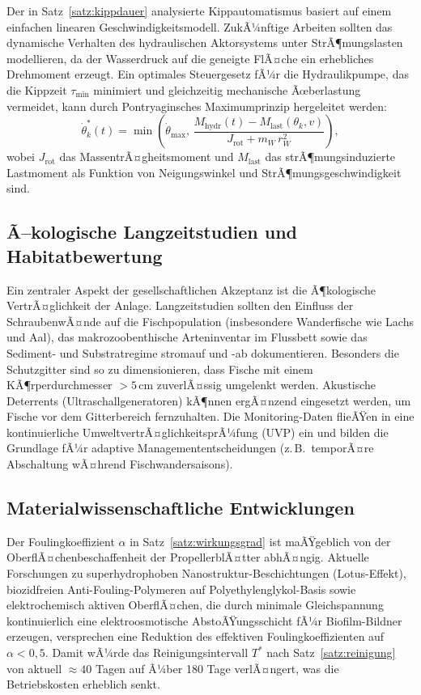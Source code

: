 ﻿\documentclass[a4paper,12pt]{article}
\theoremstyle{definition}
\begin{document}
Der in Satz~\ref{satz:kippdauer} analysierte Kippautomatismus basiert auf einem
einfachen linearen Geschwindigkeitsmodell. ZukÃ¼nftige Arbeiten sollten das dynamische
Verhalten des hydraulischen Aktorsystems unter StrÃ¶mungslasten modellieren, da der
Wasserdruck auf die geneigte FlÃ¤che ein erhebliches Drehmoment erzeugt. Ein
optimales Steuergesetz fÃ¼r die Hydraulikpumpe, das die Kippzeit $\tau_{\mathrm{min}}$
minimiert und gleichzeitig mechanische Ãœberlastung vermeidet, kann durch
Pontryaginsches Maximumprinzip hergeleitet werden:
\[
  \dot{\theta}_k^*(t) = \min\!\left(\dot{\theta}_{\max},\,
  \frac{M_{\mathrm{hydr}}(t) - M_{\mathrm{last}}(\theta_k, v)}
  {J_{\mathrm{rot}} + m_W\,r_W^2}\right),
\]
wobei $J_{\mathrm{rot}}$ das MassentrÃ¤gheitsmoment und $M_{\mathrm{last}}$ das
strÃ¶mungsinduzierte Lastmoment als Funktion von Neigungswinkel und StrÃ¶mungsgeschwindigkeit sind.

\subsection{Ã–kologische Langzeitstudien und Habitatbewertung}

Ein zentraler Aspekt der gesellschaftlichen Akzeptanz ist die Ã¶kologische
VertrÃ¤glichkeit der Anlage. Langzeitstudien sollten den Einfluss der SchraubenwÃ¤nde
auf die Fischpopulation (insbesondere Wanderfische wie Lachs und Aal), das
makrozoobenthische Arteninventar im Flussbett sowie das Sediment- und Substratregime
stromauf und -ab dokumentieren. Besonders die Schutzgitter sind so zu dimensionieren,
dass Fische mit einem KÃ¶rperdurchmesser $> 5\,\mathrm{cm}$ zuverlÃ¤ssig umgelenkt
werden. Akustische Deterrents (Ultraschallgeneratoren) kÃ¶nnen ergÃ¤nzend eingesetzt
werden, um Fische vor dem Gitterbereich fernzuhalten. Die Monitoring-Daten flieÃŸen
in eine kontinuierliche UmweltvertrÃ¤glichkeitsprÃ¼fung (UVP) ein und bilden die
Grundlage fÃ¼r adaptive Managemententscheidungen (z.\,B.\ temporÃ¤re Abschaltung
wÃ¤hrend Fischwandersaisons).

\subsection{Materialwissenschaftliche Entwicklungen}

Der Foulingkoeffizient $\alpha$ in Satz~\ref{satz:wirkungsgrad} ist maÃŸgeblich von
der OberflÃ¤chenbeschaffenheit der PropellerblÃ¤tter abhÃ¤ngig. Aktuelle Forschungen
zu superhydrophoben Nanostruktur-Beschichtungen (Lotus-Effekt), biozidfreien
Anti-Fouling-Polymeren auf Polyethylenglykol-Basis sowie elektrochemisch aktiven
OberflÃ¤chen, die durch minimale Gleichspannung kontinuierlich eine elektroosmotische
AbstoÃŸungsschicht fÃ¼r Biofilm-Bildner erzeugen, versprechen eine Reduktion des
effektiven Foulingkoeffizienten auf $\alpha < 0{,}5$. Damit wÃ¼rde das Reinigungsintervall
$T^*$ nach Satz~\ref{satz:reinigung} von aktuell $\approx 40$ Tagen auf Ã¼ber
180 Tage verlÃ¤ngert, was die Betriebskosten erheblich senkt.
\end{document}
